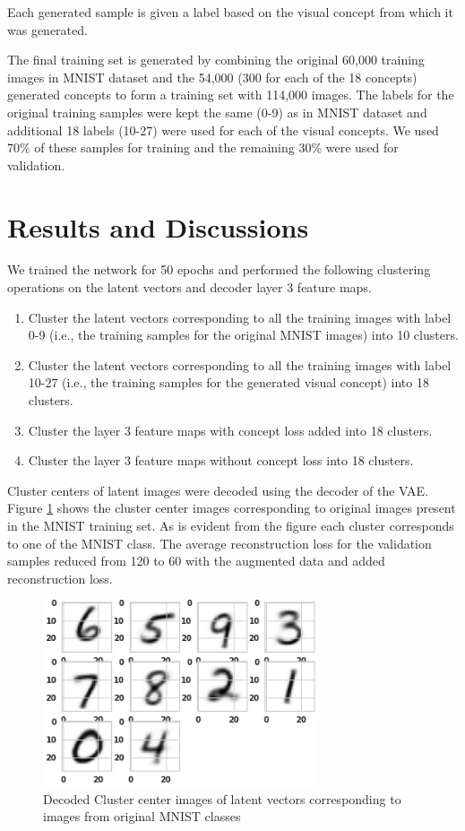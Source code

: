 \documentclass[conference]{IEEEtran}
\begin{document}
Each generated sample is given a label based on the visual concept from which it was generated.

The final training set is generated by combining the original 60,000 training images in MNIST dataset and the 54,000 (300 for each of the 18 concepts) generated concepts to form a training set with 114,000 images.
The labels for the original training samples were kept the same (0-9) as in MNIST dataset and additional 18 labels (10-27) were used for each of the visual concepts.
We used 70\%  of these samples for training and the remaining 30\% were used for validation.

\section{Results and Discussions}
We trained the network for 50 epochs and performed the following clustering operations on the latent vectors and decoder layer 3 feature maps.
\begin{enumerate}
    \item Cluster the latent vectors corresponding to all the training images with label 0-9 (i.e., the training samples for the original MNIST images) into 10 clusters.
    \item Cluster the latent vectors corresponding to all the training images with label 10-27 (i.e., the training samples for the generated visual concept) into 18 clusters.
    \item Cluster the layer 3 feature maps with concept loss added into 18 clusters.
    \item Cluster the layer 3 feature maps without concept loss into 18 clusters.
    \end{enumerate}

Cluster centers of latent images were decoded using the decoder of the VAE.
Figure \ref{cluster_center_lv_class} shows the cluster center images corresponding to original images present in the MNIST training set.
As is evident from the figure each cluster corresponds to one of the MNIST class.
The average reconstruction loss for the validation samples reduced from 120 to  60 with the augmented data and added reconstruction loss.

\begin{figure}[!t]
\centering
\includegraphics[width=3.2in]{images/cluster_center_lv_class.png}
\vspace{0.1in}

\caption{Decoded Cluster center images of latent vectors corresponding to images from original MNIST classes}
\label{cluster_center_lv_class}
\end{figure}
\end{document}
